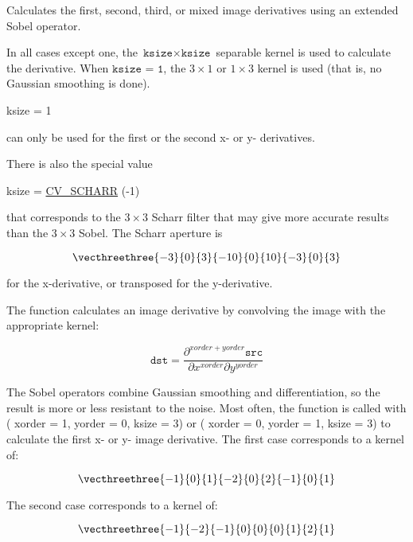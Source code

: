 Calculates the first, second, third, or mixed image derivatives using an extended Sobel operator. 

In all cases except one, the $\texttt{ksize} \times \texttt{ksize}$ separable kernel is used to calculate the derivative. When $\texttt{ksize = 1}$, the $3 \times 1$ or $1 \times 3$ kernel is used (that is, no Gaussian smoothing is done).
\begin{DoxyCode}
ksize = 1 
\end{DoxyCode}
 can only be used for the first or the second x-\/ or y-\/ derivatives. 

There is also the special value
\begin{DoxyCode}
ksize = \hyperlink{group__imgproc__c_gad680d8093fc7352b21881b08002d7698}{CV\_SCHARR} (-1) 
\end{DoxyCode}
 that corresponds to the $3\times3$ Scharr filter that may give more accurate results than the $3\times3$ Sobel. The Scharr aperture is 

\[\vecthreethree{-3}{0}{3}{-10}{0}{10}{-3}{0}{3}\] 

for the x-\/derivative, or transposed for the y-\/derivative. 

The function calculates an image derivative by convolving the image with the appropriate kernel\+: 

\[\texttt{dst} = \frac{\partial^{xorder+yorder} \texttt{src}}{\partial x^{xorder} \partial y^{yorder}}\] 

The Sobel operators combine Gaussian smoothing and differentiation, so the result is more or less resistant to the noise. Most often, the function is called with ( xorder = 1, yorder = 0, ksize = 3) or ( xorder = 0, yorder = 1, ksize = 3) to calculate the first x-\/ or y-\/ image derivative. The first case corresponds to a kernel of\+: 

\[\vecthreethree{-1}{0}{1}{-2}{0}{2}{-1}{0}{1}\] 

The second case corresponds to a kernel of\+: 

\[\vecthreethree{-1}{-2}{-1}{0}{0}{0}{1}{2}{1}\] 


